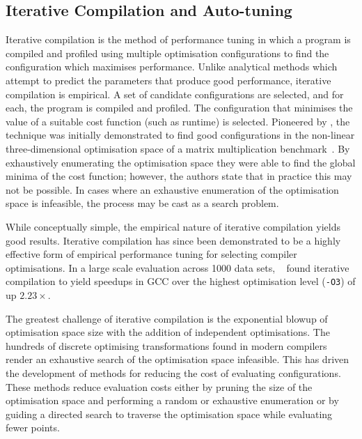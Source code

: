 \subsection{Iterative Compilation and Auto-tuning}

Iterative compilation is the method of performance tuning in which a program is compiled and profiled using multiple optimisation configurations to find the configuration which maximises performance. Unlike analytical methods which attempt to predict the parameters that produce good performance, iterative compilation is empirical. A set of candidate configurations are selected, and for each, the program is compiled and profiled. The configuration that minimises the value of a suitable cost function (such as runtime) is selected. Pioneered by \citeauthor{Bodin1998}, the technique was initially demonstrated to find good configurations in the non-linear three-dimensional optimisation space of a matrix multiplication benchmark~\cite{Bodin1998}. By exhaustively enumerating the optimisation space they were able to find the global minima of the cost function; however, the authors state that in practice this may not be possible. In cases where an exhaustive enumeration of the optimisation space is infeasible, the process may be cast as a search problem.

While conceptually simple, the empirical nature of iterative compilation yields good results. Iterative compilation has since been demonstrated to be a highly effective form of empirical performance tuning for selecting compiler optimisations.
In a large scale evaluation across 1000 data sets, \citeauthor{Chen2010}~\cite{Chen2010} found iterative compilation to yield speedups in GCC over the highest optimisation level (\texttt{-O3}) of up $2.23\times$.

The greatest challenge of iterative compilation is the exponential blowup of optimisation space size with the addition of independent optimisations. The hundreds of discrete optimising transformations found in modern compilers render an exhaustive search of the optimisation space infeasible. This has driven the development of methods for reducing the cost of evaluating configurations. These methods reduce evaluation costs either by pruning the size of the optimisation space and performing a random or exhaustive enumeration or by guiding a directed search to traverse the optimisation space while evaluating fewer points.


